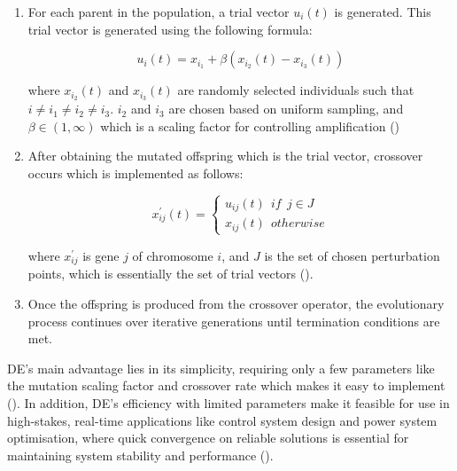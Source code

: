 \begin{enumerate}
	\item For each parent in the population, a trial vector $u_i(t)$ is generated. This trial vector is generated using the following formula:
	\begin{ceqn}
		\begin{equation}
			u_i(t) = x_{i_1} + \beta(x_{i_2}(t) - x_{i_3}(t))
		\end{equation}
	\end{ceqn}

	where $x_{i_2}(t)$ and $x_{i_3}(t)$ are randomly selected individuals such that $i \neq i_1 \neq i_2 \neq i_3$. $i_2$ and  $i_3$ are chosen based on uniform sampling, and $\beta \in (1, \infty)$ which is a scaling factor for controlling amplification (\cite{storn1995differential})

	\item After obtaining the mutated offspring which is the trial vector, crossover occurs which is implemented as follows:
	\begin{ceqn}
		\begin{equation}
			x_{ij}^{'}(t) =
			\begin{cases}
				u_{ij}(t) \:\: if \:\: j\in J \\ 
				x_{ij}(t) \:\: otherwise
			\end{cases}
		\end{equation}
	\end{ceqn}

	where $x_{ij}^{'}$ is gene $j$ of chromosome $i$, and $J$ is the set of chosen perturbation points, which is essentially the set of trial vectors (\cite{storn1995differential}).
	
	\item Once the offspring is produced from the crossover operator, the evolutionary process continues over iterative generations until termination conditions are met.
\end{enumerate}

\parbreak\noindent DE's main advantage lies in its simplicity, requiring only a few parameters like the mutation scaling factor and crossover rate which makes it easy to implement (\cite{storn1995differential}). In addition, DE's efficiency with limited parameters make it feasible for use in high-stakes, real-time applications like control system design and power system optimisation, where quick convergence on reliable solutions is essential for maintaining system stability and performance (\cite{das2010differential}).

